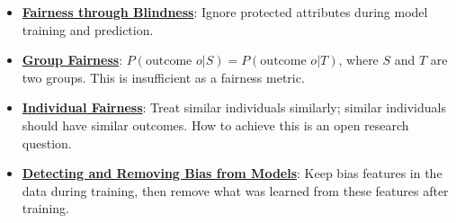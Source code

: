 \documentclass{article}%
\begin{document}
\begin{itemize}[leftmargin=*]%
\item \href{https://www.math.purdue.edu/~yipn/351/16L2-ethics.pdf#page=25}{\textbf{Fairness through Blindness}}: Ignore protected attributes during model training and prediction.%
\item \href{https://www.math.purdue.edu/~yipn/351/16L2-ethics.pdf#page=26}{\textbf{Group Fairness}}: $P(\text{outcome } o | S) = P(\text{outcome } o | T)$, where $S$ and $T$ are two groups. This is insufficient as a fairness metric.%
\item \href{https://www.math.purdue.edu/~yipn/351/16L2-ethics.pdf#page=27}{\textbf{Individual Fairness}}: Treat similar individuals similarly; similar individuals should have similar outcomes. How to achieve this is an open research question.%
\item \href{https://www.math.purdue.edu/~yipn/351/16L2-ethics.pdf#page=34}{\textbf{Detecting and Removing Bias from Models}}: Keep bias features in the data during training, then remove what was learned from these features after training.%
\end{itemize}

%
\end{document}
